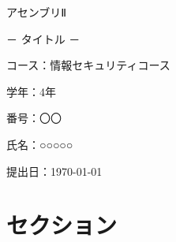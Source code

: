 \documentclass[uplatex]{jsarticle}
\begin{document}
\begin{titlepage}
    \vspace*{15truept}

    \begin{center}

        {\Large アセンブリⅡ}

        \vspace{15truept}

        {\Large － タイトル －}

        \vspace{350truept}
    \end{center}

    \hspace{120truept}
    {\large コース：情報セキュリティコース}

    \vspace{10truept}

    \hspace{120truept}
    {\large 学年：4年}

    \vspace{10truept}

    \hspace{120truept}
    {\large 番号：〇〇}

    \vspace{10truept}

    \hspace{120truept}
    {\large 氏名：○○○○○}

    \vspace{10truept}

    \hspace{120truept}
    {\large 提出日：\today}

\end{titlepage}

\section{セクション}
\end{document}
